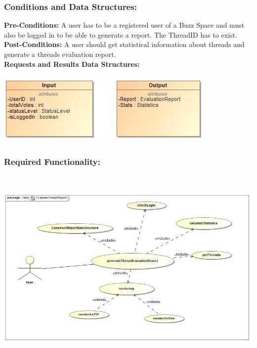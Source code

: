\documentclass[a4paper,11pt]{article}
\begin{document}
\subsubsection{Conditions and Data Structures:}
\textbf{Pre-Conditions:}
A user has to be a registered user of a Buzz Space and must also be logged in to be able to generate a report. The ThreadID has to exist.\\
\textbf{Post-Conditions:}
A user should get statistical information about threads and generate a threads evaluation report.\\
\textbf{Requests and Results Data Structures:}
\begin{center}
\includegraphics{Images/Report/Input&Output}
\end{center}
\subsubsection{Required Functionality:} 
\includegraphics[width=15cm,height=10cm]{./Images/Report/Thread_FR}\\
\end{document}
